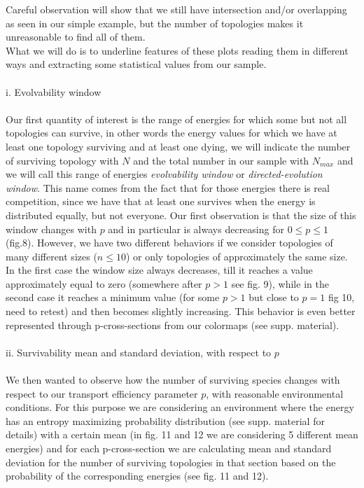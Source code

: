 \documentclass{amsart}
\theoremstyle{plain}
\numberwithin{equation}{section}
\begin{document}
Careful observation will show that we still have intersection and/or overlapping as seen in our simple example, but the number of topologies makes it unreasonable to find all of them.\\
What we will do is to underline features of these plots reading them in different ways and extracting some statistical values from our sample.\\
\\i. Evolvability window\\\\
Our first quantity of interest is the range of energies for which some but not all topologies can survive, in other words the energy values for which we have at least one topology surviving and at least one dying, we will indicate the number of surviving topology with $N$ and the total number in our sample with $N_{max}$ and we will call this range of energies \textit{evolvability window} or \textit{directed-evolution window}. This name comes from the fact that for those energies there is real competition, since we have that at least one survives when the energy is distributed equally, but not everyone.
Our first observation is that the size of this window changes with $p$ and in particular is always decreasing for $0\leq p\leq1$ (fig.8). However, we have two different behaviors if we consider topologies of many different sizes ($n\leq10$) or only topologies of approximately the same size. In the first case the window size always decreases, till it reaches a value approximately equal to zero (somewhere after $p>1$ see fig. 9), while in the second case it reaches a minimum value (for some $p>1$ but close to $p=1$ fig 10, need to retest) and then becomes slightly increasing. This behavior is even better represented through p-cross-sections from our colormaps (see supp. material).\\
\\
ii. Survivability mean and standard deviation, with respect to $p$\\
\\
We then wanted to observe how the number of surviving species changes with respect to our transport efficiency parameter $p$, with reasonable environmental conditions. For this purpose we are considering an environment where the energy has an entropy maximizing probability distribution (see supp. material for details) with a certain mean (in fig. 11 and 12 we are considering 5 different mean energies) and for each  p-cross-section we are calculating mean and standard deviation for the number of surviving topologies in that section based on the probability of the corresponding energies (see fig. 11 and 12).\\
\end{document}
